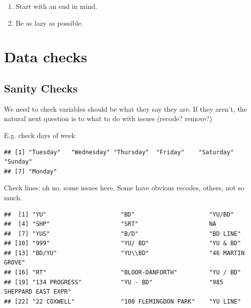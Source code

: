\documentclass[
]{book}
\newenvironment{Shaded}{\begin{snugshade}}{\end{snugshade}}
\newcommand{\DecValTok}[1]{\textcolor[rgb]{0.00,0.00,0.81}{#1}}
\newcommand{\KeywordTok}[1]{\textcolor[rgb]{0.13,0.29,0.53}{\textbf{#1}}}
\newcommand{\NormalTok}[1]{#1}
\newcommand{\OperatorTok}[1]{\textcolor[rgb]{0.81,0.36,0.00}{\textbf{#1}}}
\providecommand{\tightlist}{%
  \setlength{\itemsep}{0pt}\setlength{\parskip}{0pt}}
\begin{document}
\begin{enumerate}
\def\labelenumi{\arabic{enumi})}
\tightlist
\item
  Start with an end in mind.
\item
  Be as lazy as possible.
\end{enumerate}

\hypertarget{data-checks}{%
\section{Data checks}\label{data-checks}}

\hypertarget{sanity-checks}{%
\subsection{Sanity Checks}\label{sanity-checks}}

We need to check variables should be what they say they are. If they aren't, the natural next question is to what to do with issues (recode? remove?)

E.g. check days of week

\begin{Shaded}
\end{Shaded}

\begin{verbatim}
## [1] "Tuesday"   "Wednesday" "Thursday"  "Friday"    "Saturday"  "Sunday"   
## [7] "Monday"
\end{verbatim}

Check lines: oh no. some issues here. Some have obvious recodes, others, not so much.

\begin{Shaded}
\end{Shaded}

\begin{verbatim}
##  [1] "YU"                     "BD"                     "YU/BD"                 
##  [4] "SHP"                    "SRT"                    NA                      
##  [7] "YUS"                    "B/D"                    "BD LINE"               
## [10] "999"                    "YU/ BD"                 "YU & BD"               
## [13] "BD/YU"                  "YU\\BD"                 "46 MARTIN GROVE"       
## [16] "RT"                     "BLOOR-DANFORTH"         "YU / BD"               
## [19] "134 PROGRESS"           "YU - BD"                "985 SHEPPARD EAST EXPR"
## [22] "22 COXWELL"             "100 FLEMINGDON PARK"    "YU LINE"
\end{verbatim}
\end{document}
